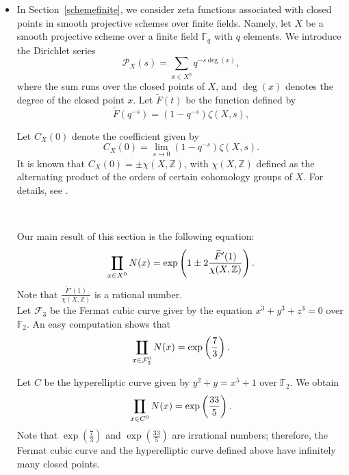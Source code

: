\documentclass[12pt]{amsart}
\DeclareMathOperator*\Rprod{%
\mathchoice
  {\ooalign{$\displaystyle\prod$\cr\hidewidth$\displaystyle\coprod$\hidewidth\cr}}%
  {\ooalign{$\textstyle\prod$\cr\hidewidth$\textstyle\coprod$\hidewidth\cr}}%
  {\ooalign{$\scriptstyle\prod$\cr\hidewidth$\scriptstyle\coprod$\hidewidth\cr}}%
  {\ooalign{$\scriptscriptstyle\prod$\cr\hidewidth$%
  \scriptscriptstyle\coprod$\hidewidth\cr}}}
\newcommand{\Z}{\mathbb{Z}}
\begin{document}
\begin{itemize}
 
For example, we obtain  
 \[
\begin{split}
\Rprod_{p \equiv 1\, (\mathrm{mod}\,{4})} p 
&= \exp\Bigg( 
    \log(\sqrt{\pi} \, G) \left( \frac{2}{\log 2} \log(2\pi) - 1 \right) \\
&\quad + \log\left( \frac{2\pi}{\sqrt{2}} \right) \left( \frac{3}{2} + \frac{1}{\log 2} \log(2\pi) \right)
\Bigg),
\end{split}
\]
  where $G$ is Gauss's constant. This example shows that there are infinitly many prime $p$ such that
  $p \equiv 1\, (\mathrm{mod}\,{4}).$\\
  
  
  
  \item In Section~\ref{schemefinite}, we consider zeta functions associated with closed points in smooth projective schemes over finite fields. Namely, let $X$ be a smooth projective scheme over a finite field $\mathbb{F}_q$ with $q$ elements. We introduce the Dirichlet series
\[
\mathcal{P}_X(s) = \sum_{x \in X^0} q^{-s \deg(x)},
\]
where the sum runs over the closed points of $X$, and $\deg(x)$ denotes the degree of the closed point $x$. Let $\widetilde{F}(t)$ be the function defined by
\[
\widetilde{F}(q^{-s}) = (1 - q^{-s}) \zeta(X,s),
\]




Let $C_X(0)$ denote the coefficient given by
\[
C_X(0) = \lim_{s \to 0} (1 - q^{-s}) \zeta(X,s).
\]
 It is known that $C_X(0) = \pm \chi(X,\mathbb{Z})$, with $\chi(X,\mathbb{Z})$ defined as the alternating product of the orders of certain cohomology groups of $X$. For details, see \cite{Geisser-2004, DixExposes, Milne1, Tate-zeta1, Tate-abelian, Tate-zeta2, Schneider-zeta}. 

\


Our main result of this section is  the following equation:
\[
\Rprod_{x \in X^0} N(x) = \exp\left(  1\pm 2\frac{\widetilde{F}'(1)}{\chi(X,\Z)} \right).
\]
Note that $\frac{\widetilde{F}'(1)}{\chi(X,\Z)}$ is a rational number.\\

Let $\mathcal F_3$ be the Fermat cubic curve giver by the equation $x^3+y^3+z^3=0$ over $\mathbb{F}_2$. 
An easy computation shows that
\[
\Rprod_{x \in \mathcal{F}_3^0} N(x) =\exp\left(\frac{7}{3}\right).
\]



Let $C$ be the hyperelliptic curve given by $y^2 + y = x^5 + 1$ over $\mathbb{F}_2$. We obtain
\[
\Rprod_{x \in C^0} N(x) =\exp\left(\frac{33}{5}\right).
\]
Note that $\exp\left(\frac{7}{3}\right)$ and $\exp\left(\frac{33}{5}\right)$ are irrational numbers; therefore, the Fermat cubic curve and the hyperelliptic curve defined above have infinitely many closed points.\\




\end{itemize}
\end{document}
